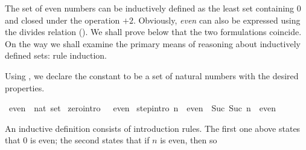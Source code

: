 %
\begin{isabellebody}%
\def\isabellecontext{Even}%
%
\isadelimtheory
%
\endisadelimtheory
%
\isatagtheory
%
\endisatagtheory
{\isafoldtheory}%
%
\isadelimtheory
%
\endisadelimtheory
%
\isadelimML
%
\endisadelimML
%
\isatagML
%
\endisatagML
{\isafoldML}%
%
\isadelimML
%
\endisadelimML
%
\isamarkuptrue%
%
\begin{isamarkuptext}%
%
The set of even numbers can be inductively defined as the least set
containing 0 and closed under the operation $+2$.  Obviously,
\emph{even} can also be expressed using the divides relation (). 
We shall prove below that the two formulations coincide.  On the way we
shall examine the primary means of reasoning about inductively defined
sets: rule induction.%
\end{isamarkuptext}%
\isamarkuptrue%
%
\isamarkuptrue%
%
\begin{isamarkuptext}%
Using , we declare the constant  to be
a set of natural numbers with the desired properties.%
\end{isamarkuptext}%
\isamarkuptrue%
\isamarkupfalse%
\ even\ {}{}\ {}nat\ set{}\ \isanewline
zero{}intro{}{}{}\ {}{}\ {}\ even{}\ {}\isanewline
step{}intro{}{}{}\ {}n\ {}\ even\ {}\ {}Suc\ {}Suc\ n{}{}\ {}\ even{}%
\begin{isamarkuptext}%
An inductive definition consists of introduction rules.  The first one
above states that 0 is even; the second states that if $n$ is even, then so

\end{isamarkuptext}
\end{isabellebody}
